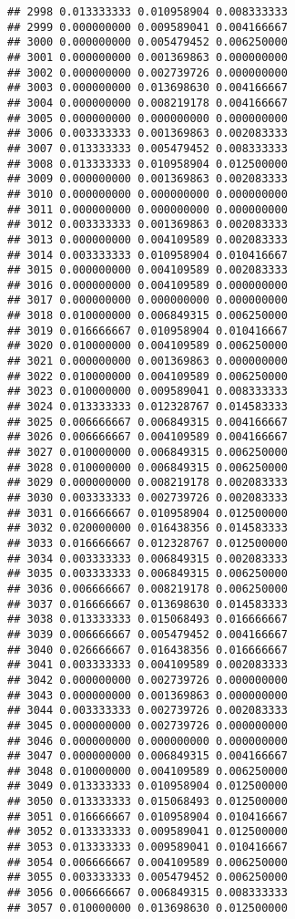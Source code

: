 \documentclass[
]{article}
\begin{document}
\begin{verbatim}
## 2998 0.013333333 0.010958904 0.008333333
## 2999 0.000000000 0.009589041 0.004166667
## 3000 0.000000000 0.005479452 0.006250000
## 3001 0.000000000 0.001369863 0.000000000
## 3002 0.000000000 0.002739726 0.000000000
## 3003 0.000000000 0.013698630 0.004166667
## 3004 0.000000000 0.008219178 0.004166667
## 3005 0.000000000 0.000000000 0.000000000
## 3006 0.003333333 0.001369863 0.002083333
## 3007 0.013333333 0.005479452 0.008333333
## 3008 0.013333333 0.010958904 0.012500000
## 3009 0.000000000 0.001369863 0.002083333
## 3010 0.000000000 0.000000000 0.000000000
## 3011 0.000000000 0.000000000 0.000000000
## 3012 0.003333333 0.001369863 0.002083333
## 3013 0.000000000 0.004109589 0.002083333
## 3014 0.003333333 0.010958904 0.010416667
## 3015 0.000000000 0.004109589 0.002083333
## 3016 0.000000000 0.004109589 0.000000000
## 3017 0.000000000 0.000000000 0.000000000
## 3018 0.010000000 0.006849315 0.006250000
## 3019 0.016666667 0.010958904 0.010416667
## 3020 0.010000000 0.004109589 0.006250000
## 3021 0.000000000 0.001369863 0.000000000
## 3022 0.010000000 0.004109589 0.006250000
## 3023 0.010000000 0.009589041 0.008333333
## 3024 0.013333333 0.012328767 0.014583333
## 3025 0.006666667 0.006849315 0.004166667
## 3026 0.006666667 0.004109589 0.004166667
## 3027 0.010000000 0.006849315 0.006250000
## 3028 0.010000000 0.006849315 0.006250000
## 3029 0.000000000 0.008219178 0.002083333
## 3030 0.003333333 0.002739726 0.002083333
## 3031 0.016666667 0.010958904 0.012500000
## 3032 0.020000000 0.016438356 0.014583333
## 3033 0.016666667 0.012328767 0.012500000
## 3034 0.003333333 0.006849315 0.002083333
## 3035 0.003333333 0.006849315 0.006250000
## 3036 0.006666667 0.008219178 0.006250000
## 3037 0.016666667 0.013698630 0.014583333
## 3038 0.013333333 0.015068493 0.016666667
## 3039 0.006666667 0.005479452 0.004166667
## 3040 0.026666667 0.016438356 0.016666667
## 3041 0.003333333 0.004109589 0.002083333
## 3042 0.000000000 0.002739726 0.000000000
## 3043 0.000000000 0.001369863 0.000000000
## 3044 0.003333333 0.002739726 0.002083333
## 3045 0.000000000 0.002739726 0.000000000
## 3046 0.000000000 0.000000000 0.000000000
## 3047 0.000000000 0.006849315 0.004166667
## 3048 0.010000000 0.004109589 0.006250000
## 3049 0.013333333 0.010958904 0.012500000
## 3050 0.013333333 0.015068493 0.012500000
## 3051 0.016666667 0.010958904 0.010416667
## 3052 0.013333333 0.009589041 0.012500000
## 3053 0.013333333 0.009589041 0.010416667
## 3054 0.006666667 0.004109589 0.006250000
## 3055 0.003333333 0.005479452 0.006250000
## 3056 0.006666667 0.006849315 0.008333333
## 3057 0.010000000 0.013698630 0.012500000

\end{verbatim}
\end{document}
